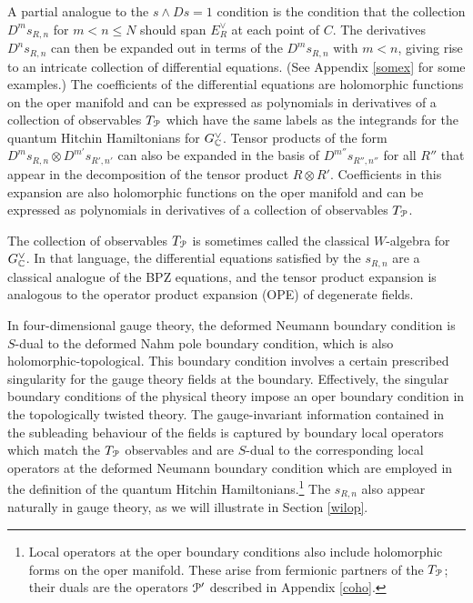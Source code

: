 \documentclass[11pt,a4paper]{article}
\begin{document}
A partial analogue to the $s \wedge D s=1$ condition is the condition that the collection $D^m s_{R,n}$ for $m< n\leq N$ should 
span $E^\vee_{R}$ at each point of $C$. The derivatives $D^n s_{R,n}$ can then be expanded out in terms of the $D^m s_{R,n}$ with $m<n$, giving rise to an intricate collection of differential equations. (See Appendix \ref{somex} for some examples.)   The coefficients of the differential equations 
are holomorphic functions on the oper manifold and can be expressed as polynomials in derivatives of a collection of observables $T_{\cal P}$ 
which have the same labels as the integrands for the quantum Hitchin Hamiltonians for $G^\vee_{\mathbb C}$. Tensor products of the form $D^m s_{R,n} \otimes D^{m'} s_{R',n'}$ 
can also be expanded in the basis of $D^{m''} s_{R'',n''}$ for all $R''$ that appear in the decomposition of the tensor product $R \otimes R'$. 
Coefficients  in this expansion
 are also holomorphic functions on the oper manifold and can be expressed as polynomials in derivatives of a collection of observables $T_{\cal P}$. 

The collection of observables  $T_{\cal P}$ is sometimes called the classical $W$-algebra for $G^\vee_{\mathbb C}$. In that language, the differential equations satisfied by the 
$s_{R,n}$ are a classical analogue of the BPZ equations,
and the tensor product expansion is analogous to the operator product expansion (OPE) of degenerate fields.  

In four-dimensional gauge theory, the deformed Neumann boundary condition is $S$-dual to the deformed Nahm pole boundary condition,
which is also holomorphic-topological. This boundary condition involves a certain prescribed singularity for the gauge theory fields at the boundary. 
Effectively, the singular boundary conditions of the physical theory impose an oper boundary condition in the topologically twisted theory. 
The gauge-invariant information contained in the subleading behaviour of the fields is captured by boundary local operators which match the $T_{\cal P}$ 
observables and are $S$-dual to the corresponding local operators at the deformed Neumann boundary condition which are employed in 
the definition of the quantum Hitchin Hamiltonians.\footnote{Local operators at the oper
boundary conditions  also include holomorphic
forms on the oper manifold.   These arise from  fermionic partners of the
$T_{\cal P}$; their duals are the operators $\cal P'$ described in Appendix \ref{coho}.} The $s_{R,n}$ also appear naturally in gauge theory, as we will illustrate in Section \ref{wilop}.
\end{document}

